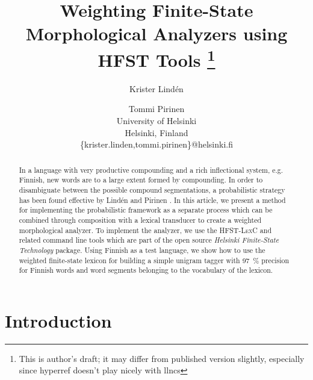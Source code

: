 \documentclass[a4paper]{article}
\begin{document}

\ifpdf
{}
\fi

\title{Weighting Finite-State Morphological Analyzers
  using \textsc{HFST} Tools
  \footnote{This is author's draft; it may differ from published version slightly, especially since hyperref doesn't play nicely with llncs}}

\author{Krister Lindén \and Tommi Pirinen \\%
%
  University of Helsinki\\
  Helsinki, Finland\\
  \{krister.linden,tommi.pirinen\}@helsinki.fi\\
}

\maketitle
\begin{abstract}
  In a language with very productive compounding and a rich
  inflectional system, e.g. Finnish, new words are to a large extent
  formed by compounding. In order to disambiguate between the possible
  compound segmentations, a probabilistic strategy has been found
  effective by Lindén and Pirinen \cite{linden09nodalida}. In this
  article, we present a method for implementing the probabilistic
  framework as a separate process which can be combined through
  composition with a lexical transducer to create a weighted
  morphological analyzer. To implement the analyzer, we use the
  \textsc{HFST-LexC} and related command line tools which are part of
  the open source \emph{Helsinki Finite-State Technology} package.
  Using Finnish as a test language, we show how to use the weighted
  finite-state lexicon for building a simple unigram tagger with 97~\%
  precision for Finnish words and word segments belonging to the
  vocabulary of the lexicon.
\end{abstract}


\section{Introduction}
\end{document}
